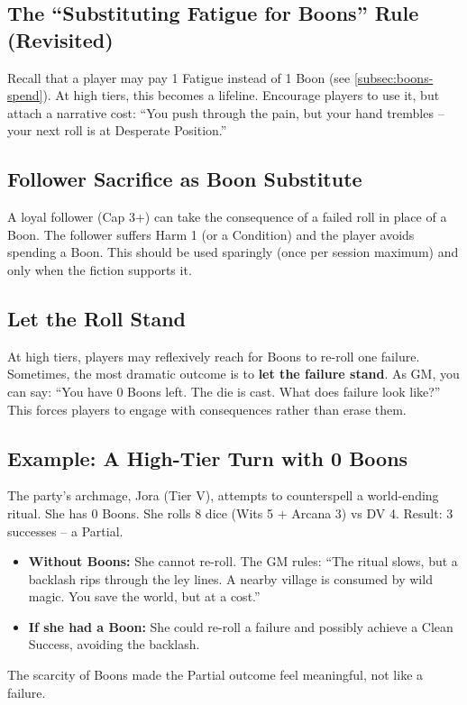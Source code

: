 \subsection*{The ``Substituting Fatigue for Boons'' Rule (Revisited)}
Recall that a player may pay 1 Fatigue instead of 1 Boon (see \ref{subsec:boons-spend}). At high tiers, this becomes a lifeline. Encourage players to use it, but attach a narrative cost: ``You push through the pain, but your hand trembles -- your next roll is at Desperate Position.''

\subsection*{Follower Sacrifice as Boon Substitute}
A loyal follower (Cap 3+) can take the consequence of a failed roll in place of a Boon. The follower suffers Harm 1 (or a Condition) and the player avoids spending a Boon. This should be used sparingly (once per session maximum) and only when the fiction supports it.

\subsection*{Let the Roll Stand}
At high tiers, players may reflexively reach for Boons to re-roll one failure. Sometimes, the most dramatic outcome is to \textbf{let the failure stand}. As GM, you can say: ``You have 0 Boons left. The die is cast. What does failure look like?'' This forces players to engage with consequences rather than erase them.

\subsection*{Example: A High-Tier Turn with 0 Boons}
The party's archmage, Jora (Tier V), attempts to counterspell a world-ending ritual. She has 0 Boons. She rolls 8 dice (Wits 5 + Arcana 3) vs DV 4. Result: 3 successes -- a Partial.
\begin{itemize}
  \item \textbf{Without Boons:} She cannot re-roll. The GM rules: ``The ritual slows, but a backlash rips through the ley lines. A nearby village is consumed by wild magic. You save the world, but at a cost.''
  \item \textbf{If she had a Boon:} She could re-roll a failure and possibly achieve a Clean Success, avoiding the backlash.
\end{itemize}
The scarcity of Boons made the Partial outcome feel meaningful, not like a failure.

